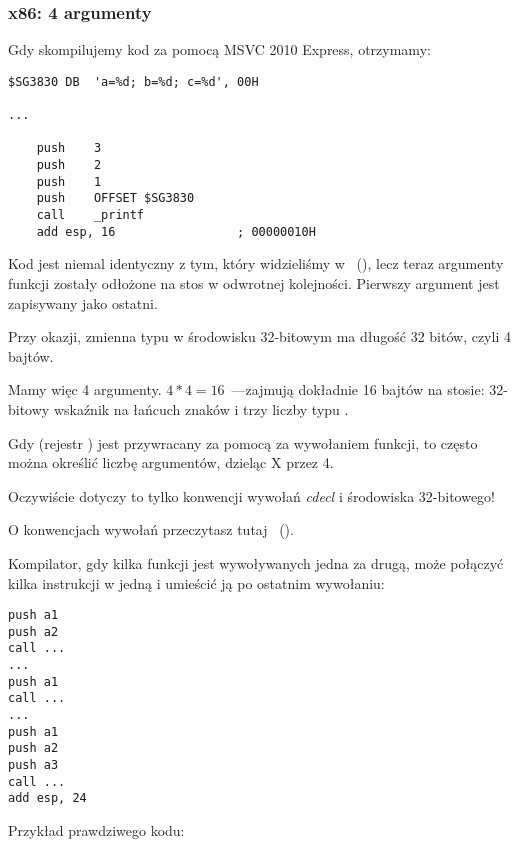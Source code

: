 \subsubsection{x86: 4 argumenty}


Gdy skompilujemy kod za pomocą MSVC 2010 Express, otrzymamy:

\begin{lstlisting}[style=customasmx86]
$SG3830	DB	'a=%d; b=%d; c=%d', 00H

...

	push	3
	push	2
	push	1
	push	OFFSET $SG3830
	call	_printf
	add	esp, 16					; 00000010H
\end{lstlisting}

Kod jest niemal identyczny z tym, który widzieliśmy w \emph{\HelloWorldSectionName}~(), lecz teraz argumenty funkcji \printf zostały odłożone na stos w odwrotnej kolejności. Pierwszy argument jest zapisywany jako ostatni.

Przy okazji, zmienna typu \Tint w środowisku 32-bitowym ma długość 32 bitów, czyli 4 bajtów.

Mamy więc 4 argumenty. $4*4 = 16$~---zajmują dokładnie 16 bajtów na stosie: 32-bitowy wskaźnik na łańcuch znaków i trzy liczby typu \Tint.

Gdy  (rejestr \ESP) jest przywracany za pomocą  za wywołaniem funkcji, to często można określić liczbę argumentów, dzieląc X przez 4.

Oczywiście dotyczy to tylko konwencji wywołań \emph{cdecl} i środowiska 32-bitowego!

O konwencjach wywołań przeczytasz tutaj ~().

Kompilator, gdy kilka funkcji jest wywoływanych jedna za drugą, może połączyć kilka instrukcji  w jedną i umieścić ją po ostatnim wywołaniu:

\begin{lstlisting}[style=customasmx86]
push a1
push a2
call ...
...
push a1
call ...
...
push a1
push a2
push a3
call ...
add esp, 24
\end{lstlisting}

Przykład prawdziwego kodu:



\clearpage
{}
\myindex{\olly}

